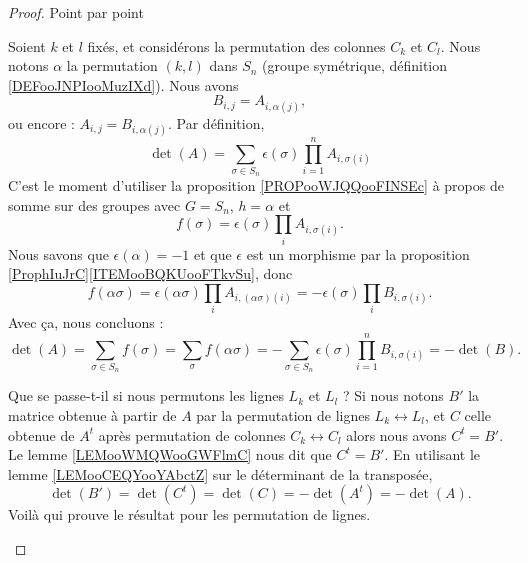 \begin{proof}
	Point par point
	\begin{subproof}
		Soient \( k\) et \( l\) fixés, et considérons la permutation des colonnes \( C_k\) et \( C_l\). Nous notons \( \alpha\) la permutation \( (k,l)\) dans \( S_n\) (groupe symétrique, définition \ref{DEFooJNPIooMuzIXd}). Nous avons
		\begin{equation}
			B_{i,j}=A_{i,\alpha(j)},
		\end{equation}
		ou encore : \( A_{i,j}=B_{i,\alpha(j)}\). Par définition,
		\begin{equation}
			\det(A)=\sum_{\sigma\in S_{n}}\epsilon(\sigma)\prod_{i=1}^n A_{i,\sigma(i)}
		\end{equation}
		C'est le moment d'utiliser la proposition \ref{PROPooWJQQooFINSEc} à propos de somme sur des groupes avec \( G=S_n\), \( h=\alpha\) et
		\begin{equation}
			f(\sigma)=\epsilon(\sigma)\prod_iA_{i,\sigma(i)}.
		\end{equation}
		Nous savons que \( \epsilon(\alpha)=-1\) et que \( \epsilon\) est un morphisme par la proposition \ref{ProphIuJrC}\ref{ITEMooBQKUooFTkvSu}, donc
		\begin{equation}
			f(\alpha \sigma)=\epsilon(\alpha\sigma)\prod_iA_{i,(\alpha\sigma)(i)}=-\epsilon(\sigma)\prod_iB_{i,\sigma(i)}.
		\end{equation}
		Avec ça, nous concluons :
		\begin{equation}
			\det(A)=\sum_{\sigma\in S_n}f(\sigma)=\sum_{\sigma}f(\alpha \sigma)=-\sum_{\sigma\in S_n}\epsilon(\sigma)\prod_{i=1}^n B_{i,\sigma(i)}=-\det(B).
		\end{equation}

		Que se passe-t-il si nous permutons les lignes \( L_k\) et \( L_{l}\) ? Si nous notons \( B'\) la matrice obtenue à partir de \( A\) par la permutation de lignes \( L_k\leftrightarrow L_l\), et \( C\) celle obtenue de \( A^t\) après permutation de colonnes \( C_k\leftrightarrow C_l\) alors nous avons \( C^t=B'\). Le lemme \ref{LEMooWMQWooGWFlmC} nous dit que \( C^t=B'\). En utilisant le lemme \ref{LEMooCEQYooYAbctZ} sur le déterminant de la transposée,
		\begin{equation}
			\det(B')=\det(C^t)=\det(C)=-\det(A^t)=-\det(A).
		\end{equation}
		Voilà qui prouve le résultat pour les permutation de lignes.


\end{subproof}
\end{proof}
